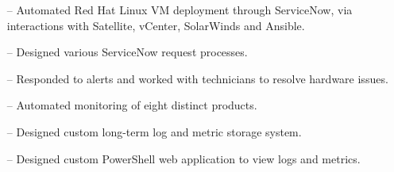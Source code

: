 \documentclass[10pt,a4paper]{altacv}
\begin{document}
\tagline{}

%

\begin{fullwidth}
\makecvheader
\end{fullwidth}

%





\begin{itemize}
    \setlength{\itemindent}{0.5em}
    \item[--]   \small{Automated Red Hat Linux VM deployment through ServiceNow, via interactions with Satellite, vCenter, SolarWinds and Ansible.}
    \item[--]   \small{Designed various ServiceNow request processes.}
\end{itemize}

\medskip



\begin{itemize}
    \setlength{\itemindent}{0.5em}
    \item[--]   \small{Responded to alerts and worked with technicians to resolve hardware issues.}
    \item[--]   \small{Automated monitoring of eight distinct products.}
    \item[--]   \small{Designed custom long-term log and metric storage system.}
    \item[--]   \small{Designed custom PowerShell web application to view logs and metrics.}
\end{itemize}

\medskip

\end{document}
